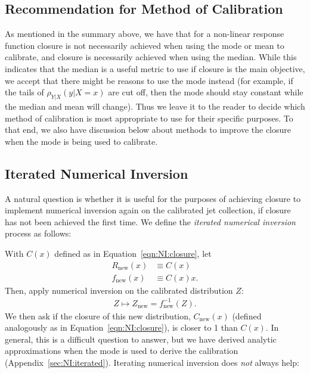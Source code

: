 \subsection{Recommendation for Method of Calibration}
\label{sec:NI:recommendations}
As mentioned in the summary above, we have that for a non-linear response function closure is not necessarily achieved when using the mode or mean to calibrate, and closure is necessarily achieved when using the median. While this indicates that the median is a useful metric to use if closure is the main objective, we accept that there might be reasons to use the mode instead (for example, if the tails of $\rho_{Y|X}(y|X=x)$ are cut off, then the mode should stay constant while the median and mean will change). Thus we leave it to the reader to decide which method of calibration is most appropriate to use for their specific purposes. To that end, we also have discussion below about methods to improve the closure when the mode is being used to calibrate.

\subsection{Iterated Numerical Inversion}
\label{sec:NI:iterated_text}
A natural question is whether it is useful for the purposes of achieving closure to implement numerical inversion again on the calibrated jet collection, if closure has not been achieved the first time. We define the \emph{iterated numerical inversion} process as follows:

\vspace{5mm}

\noindent With $C(x)$ defined as in Equation~\ref{eqn:NI:closure}, let
\begin{align}
R_{\text{new}}(x) &\equiv C(x)\\
f_{\text{new}}(x) &\equiv C(x)x.
\end{align}
Then, apply numerical inversion on the calibrated distribution $Z$:
\begin{align}
Z\mapsto Z_\text{new} = f_{\text{new}}^{-1}(Z).
\end{align}
We then ask if the closure of this new distribution, $C_\text{new}(x)$ (defined analogously as in Equation~\ref{eqn:NI:closure}), is closer to 1 than $C(x)$.  In general, this is a difficult question to answer, but we have derived analytic approximations when the mode is used to derive the calibration (Appendix~\ref{sec:NI:iterated}).  Iterating numerical inversion does \emph{not} always help:

